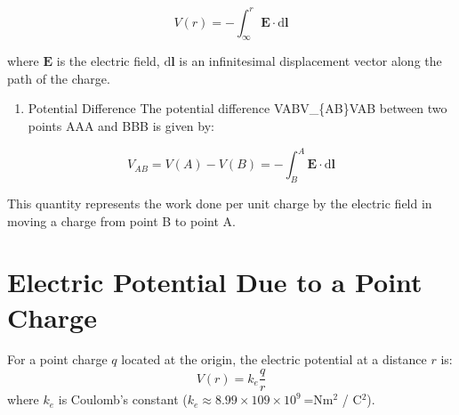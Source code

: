 \documentclass[
  letterpaper,
  DIV=11,
  numbers=noendperiod]{scrreprt}
\providecommand{\tightlist}{%
  \setlength{\itemsep}{0pt}\setlength{\parskip}{0pt}}\usepackage{longtable,booktabs,array}
\begin{document}
\[ V(r)=−\int_\infty^r \mathrm{\mathbf{E}}\cdot \mathrm{d}\mathrm{\mathbf{l}}\]

where \(\mathrm{\mathbf{E}}\) is the electric field,
\(\mathrm{d}\mathrm{\mathbf{l}}\) is an infinitesimal displacement
vector along the path of the charge.

\begin{enumerate}
\def\labelenumi{\arabic{enumi}.}
\setcounter{enumi}{2}
\tightlist
\item
  Potential Difference The potential difference VABV\_\{AB\}VAB between
  two points AAA and BBB is given by:
\end{enumerate}

\[ V_{AB} = V(A)−V(B) = -\int_{B}^{A} \mathrm{\mathbf{E}}\cdot \mathrm{d} \mathrm{\mathbf{l}}\]

This quantity represents the work done per unit charge by the electric
field in moving a charge from point B to point A.

\section{Electric Potential Due to a Point
Charge}\label{electric-potential-due-to-a-point-charge}

For a point charge \(q\) located at the origin, the electric potential
at a distance \(r\) is: \[ V(r) = k_e \frac{q}{r} \] where \(k_e\) is
Coulomb's constant (\(k_e \approx 8.99×109 \times 10^9\) =Nm\(^2\) /
C\(^2\)).
\end{document}

